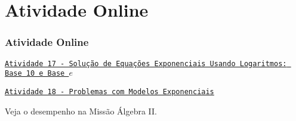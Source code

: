 \section{Atividade Online}
\begin{frame}
\frametitle{Atividade Online} 

\href{https://pt.khanacademy.org/math/algebra2/exponential-and-logarithmic-functions/solving-exponential-equations-with-logarithms/e/using-logarithms-to-solve-exponential-equations}
{{\tt Atividade 17 - Solução de Equações Exponenciais Usando
Logaritmos: Base 10 e Base $e$}}


\href{https://pt.khanacademy.org/math/algebra2/exponential-and-logarithmic-functions/solving-exponential-models/e/exponential-models-word-problems}
{{\tt Atividade 18 - Problemas com Modelos Exponenciais}}

Veja o desempenho na Missão Álgebra II.


\end{frame}